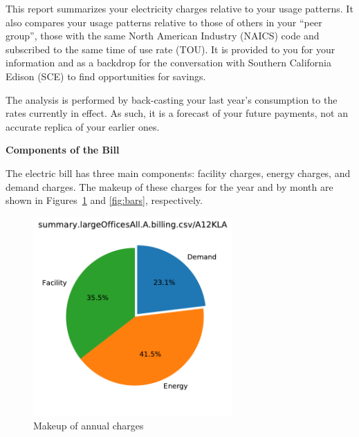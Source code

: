 \documentclass[11pt]{article}
\begin{document}
\pagestyle{title}
This report summarizes your electricity charges relative to your usage patterns. It also compares your usage patterns relative to those of others in your ``peer group'', those with the same North American Industry (NAICS) code and subscribed to the same time of use rate (TOU). It is provided to you for your information and as a backdrop for the conversation with Southern California Edison (SCE) to find opportunities for savings.

The analysis is performed by back-casting your last year's consumption to the rates currently in effect. As such, it is a forecast of your future payments, not an accurate replica of your earlier ones.

\vspace{3ex}
\textbf{\Large Components of the Bill}
\vspace{1ex}

The electric bill has three main components: facility charges, energy charges, and demand charges. The makeup of these charges for the year and by month are shown in Figures~\ref{fig:pie} and \ref{fig:bars}, respectively.
\begin{figure}[!h]
\centering
\includegraphics[height=3in, page=1, trim=0in 0.45in 0in 0.45in, clip]{visuals/largeOfficesAll.A.piecharts.pdf}
\caption{Makeup of annual charges}
\label{fig:pie}
\end{figure}
\end{document}
